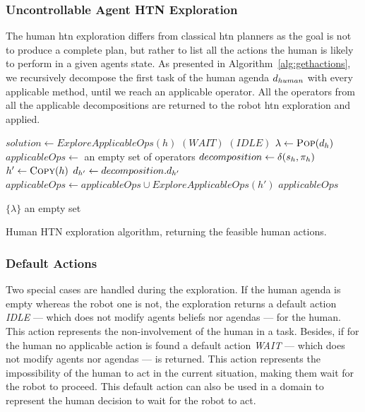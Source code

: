 \documentclass[a4paper,11pt,twoside]{StyleThese}
\begin{document}
\subsubsection{Uncontrollable Agent HTN Exploration}
The human \acrshort{htn} exploration differs from classical \acrshort{htn} planners as the goal is not to produce a complete plan, but rather to list all the actions the human is likely to perform in a given agents state. As presented in Algorithm~\ref{alg:gethactions}, we recursively decompose the first task of the human agenda $d_{human}$ with every applicable method, until we reach an applicable operator. All the operators from all the applicable decompositions are returned to the robot \acrshort{htn} exploration and applied.

\begin{algorithm}[htb!]
\begin{algorithmic}[1]
\State $solution \leftarrow ExploreApplicableOps(h)$
	\Return $(WAIT)$
\EndIf
\EndFunction
\Statex
{}
	\Return $(IDLE)$
\EndIf
\State $\lambda \leftarrow \textsc{Pop}(d_h)$
	\State $applicableOps \leftarrow$ an empty set of operators
		\State $decomposition \leftarrow \delta(s_h, \pi_h)$
			\State $h' \leftarrow \textsc{Copy}(h)$
			\State $d_{h'} \leftarrow decomposition.d_{h'}$
			\State $applicableOps \leftarrow applicableOps \cup ExploreApplicableOps(h')$
		\EndIf
	\EndFor
	\State \Return $applicableOps$
\EndIf

		\State \Return $\{\lambda\}$
	\Else
		\State \Return an empty set
	\EndIf
\EndIf
\EndFunction
	
\end{algorithmic}
 \caption{Human HTN exploration algorithm, returning the feasible human actions.}
 \label{alg:gethactions}
\end{algorithm}

\subsubsection{Default Actions} Two special cases are handled during the exploration. If the human agenda is empty whereas the robot one is not, the exploration returns a default action \textit{IDLE} --- which does not modify agents beliefs nor agendas --- for the human. This action represents the non-involvement of the human in a task. Besides, if for the human no applicable action is found a default action \textit{WAIT} --- which does not modify agents nor agendas --- is returned. This action represents the impossibility of the human to act in the current situation, making them wait for the robot to proceed. This default action can also be used in a domain to represent the human decision to wait for the robot to act.
\end{document}
